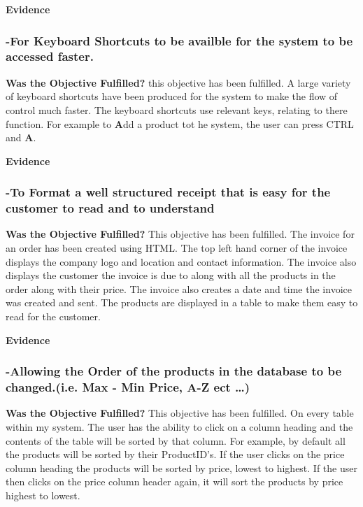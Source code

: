 \textbf{Evidence} \newline




\subsubsection{-For Keyboard Shortcuts to be availble for the system to be accessed faster.}
\textbf{Was the Objective Fulfilled?} \newline
this objective has been fulfilled. A large variety of keyboard shortcuts have been produced for the system to make the flow of control much faster. The keyboard shortcuts use relevant keys, relating to there function. For example to \textbf{A}dd a product tot he system, the user can press CTRL and \textbf{A}. 

\textbf{Evidence} \newline




\subsubsection{-To Format a well structured receipt that is easy for the customer to read and to understand}
\textbf{Was the Objective Fulfilled?} \newline
This objective has been fulfilled. The invoice for an order has been created using HTML. The top left hand corner of the invoice displays the company logo and location and contact information. The invoice also displays the customer the invoice is due to along with all the products in the order along with their price. The invoice also creates a date and time the invoice was created and sent. The products are displayed in a table to make them easy to read for the customer.

\textbf{Evidence} \newline




\subsubsection{-Allowing the Order of the products in the database to be changed.(i.e. Max - Min Price, A-Z ect \ldots)}
\textbf{Was the Objective Fulfilled?} \newline
This objective has been fulfilled. On every table within my system. The user has the ability to click on a column heading and the contents of the table will be sorted by that column. For example, by default all the products will be sorted by their ProductID's. If the user clicks on the price column heading the products will be sorted by price, lowest to highest. If the user then clicks on the price column header again, it will sort the products by price highest to lowest.

